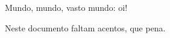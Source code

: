 \documentclass{memoir}
\begin{document}
Mundo, mundo, vasto mundo: oi!

Neste documento faltam acentos, que pena.
\end{document}
